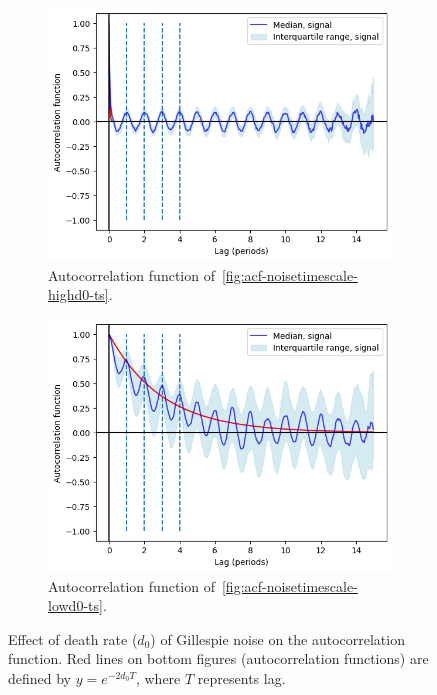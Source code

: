 \begin{figure}
  \begin{subfigure}[t]{0.45\textwidth}
  \centering
    \includegraphics[width=\linewidth]{gillespie_k5_d0p5_acf.png}
    \caption{
      Autocorrelation function of~\ref{fig:acf-noisetimescale-highd0-ts}.
    }
    \label{fig:acf-noisetimescale-highd0-acf}
  \end{subfigure}%
  \begin{subfigure}[t]{0.45\textwidth}
  \centering
    \includegraphics[width=\linewidth]{gillespie_k5_d0p005_acf.png}
    \caption{
      Autocorrelation function of~\ref{fig:acf-noisetimescale-lowd0-ts}.
    }
    \label{fig:acf-noisetimescale-lowd0-acf}
  \end{subfigure}

  \caption{
    Effect of death rate ($d_{0}$) of Gillespie noise on the autocorrelation function.
    Red lines on bottom figures (autocorrelation functions) are defined by $y = e^{-2d_{0}T}$, where $T$ represents lag.
  }
  \label{fig:acf-noisetimescale}
\end{figure}

